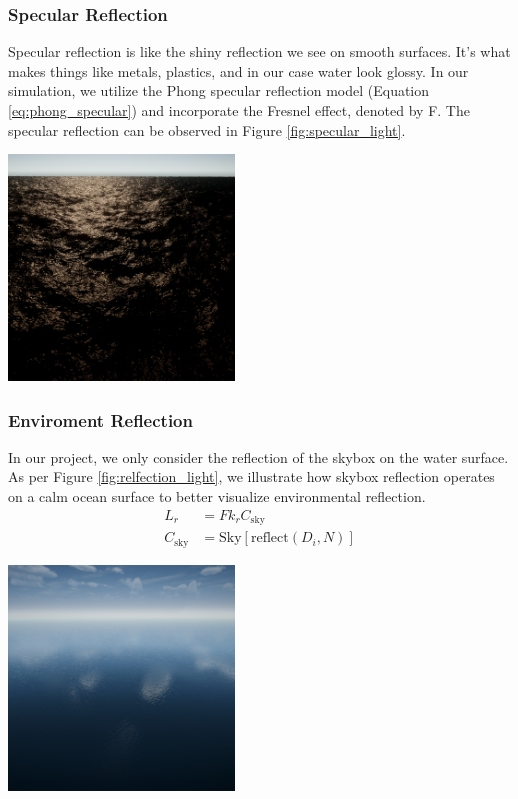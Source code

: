 \subsubsection{Specular Reflection}
Specular reflection is like the shiny reflection we see on smooth surfaces. It's what makes things like metals, plastics, and in our case water look glossy. In our simulation, we utilize the Phong specular reflection model (Equation \ref{eq:phong_specular}) and incorporate the Fresnel effect, denoted by F. The specular reflection can be observed in Figure \ref{fig:specular_light}.

\begin{minipage}{1\textwidth}
    \centering
    \includegraphics[width=0.45\textwidth]{"images/specular_light.png"}
    \label{fig:specular_light}
\end{minipage}

\subsubsection{Enviroment Reflection}
In our project, we only consider the reflection of the skybox on the water surface. As per Figure \ref{fig:relfection_light}, we illustrate how skybox reflection operates on a calm ocean surface to better visualize environmental reflection.
\begin{equation}
    \begin{split}
        L_r &= F k_r C_{\text{sky}}\\
        C_{\text{sky}} &= \text{Sky}[\text{reflect}({D_i, N})]
    \end{split}
\end{equation}
\begin{minipage}{1\textwidth}
    \centering
    \includegraphics[width=0.45\textwidth]{"images/reflection_light.png"}
    \label{fig:relfection_light}
\end{minipage}

